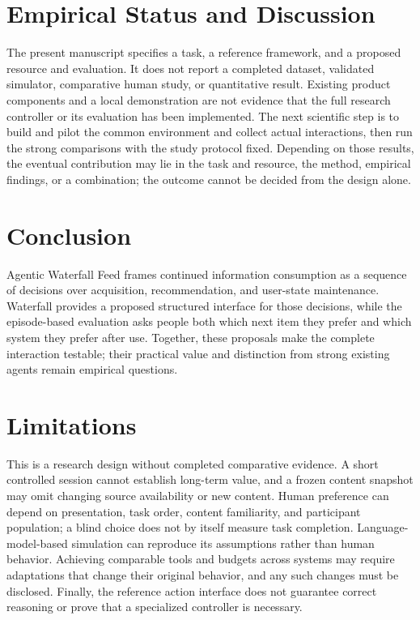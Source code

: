 \documentclass[11pt]{article}
\begin{document}
\section{Empirical Status and Discussion}
The present manuscript specifies a task, a reference framework, and a proposed resource and evaluation. It does not report a completed dataset, validated simulator, comparative human study, or quantitative result. Existing product components and a local demonstration are not evidence that the full research controller or its evaluation has been implemented. The next scientific step is to build and pilot the common environment and collect actual interactions, then run the strong comparisons with the study protocol fixed. Depending on those results, the eventual contribution may lie in the task and resource, the method, empirical findings, or a combination; the outcome cannot be decided from the design alone.

\section{Conclusion}
Agentic Waterfall Feed frames continued information consumption as a sequence of decisions over acquisition, recommendation, and user-state maintenance. Waterfall provides a proposed structured interface for those decisions, while the episode-based evaluation asks people both which next item they prefer and which system they prefer after use. Together, these proposals make the complete interaction testable; their practical value and distinction from strong existing agents remain empirical questions.

\section*{Limitations}
This is a research design without completed comparative evidence. A short controlled session cannot establish long-term value, and a frozen content snapshot may omit changing source availability or new content. Human preference can depend on presentation, task order, content familiarity, and participant population; a blind choice does not by itself measure task completion. Language-model-based simulation can reproduce its assumptions rather than human behavior. Achieving comparable tools and budgets across systems may require adaptations that change their original behavior, and any such changes must be disclosed. Finally, the reference action interface does not guarantee correct reasoning or prove that a specialized controller is necessary.
\end{document}
